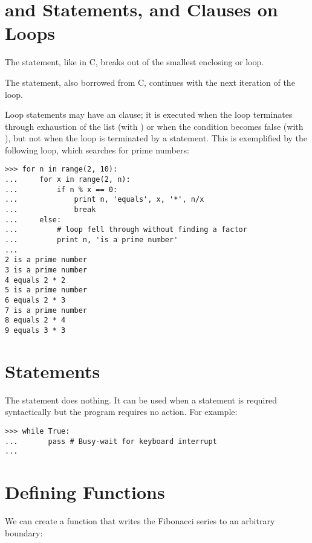 \documentclass{manual}
\begin{document}
\section{ and  Statements, and
          Clauses on Loops
         \label{break}}

The  statement, like in C, breaks out of the smallest
enclosing  or  loop.

The  statement, also borrowed from C, continues
with the next iteration of the loop.

Loop statements may have an  clause; it is executed when
the loop terminates through exhaustion of the list (with
) or when the condition becomes false (with
), but not when the loop is terminated by a
 statement.  This is exemplified by the following loop,
which searches for prime numbers:

\begin{verbatim}
>>> for n in range(2, 10):
...     for x in range(2, n):
...         if n % x == 0:
...             print n, 'equals', x, '*', n/x
...             break
...     else:
...         # loop fell through without finding a factor
...         print n, 'is a prime number'
... 
2 is a prime number
3 is a prime number
4 equals 2 * 2
5 is a prime number
6 equals 2 * 3
7 is a prime number
8 equals 2 * 4
9 equals 3 * 3
\end{verbatim}


\section{ Statements \label{pass}}

The  statement does nothing.
It can be used when a statement is required syntactically but the
program requires no action.
For example:

\begin{verbatim}
>>> while True:
...       pass # Busy-wait for keyboard interrupt
... 
\end{verbatim}


\section{Defining Functions \label{functions}}

We can create a function that writes the Fibonacci series to an
arbitrary boundary:
\end{document}
